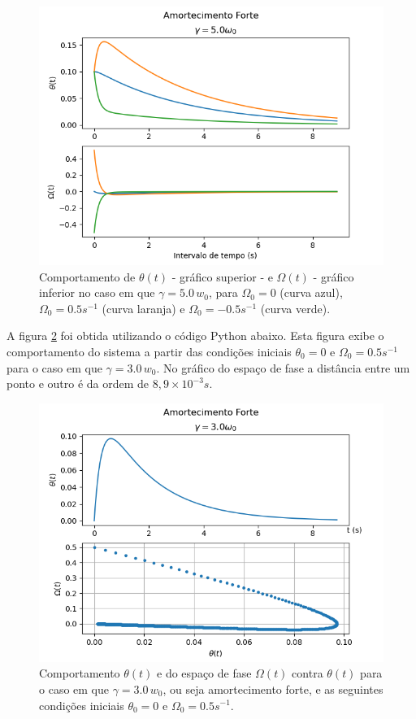 \documentclass[12pt,openright,twoside,english,brazil]{abntex2}
\begin{document}
\begin{figure}[h]
 \centering
 \includegraphics[width=1.0\linewidth]{forte-2.png}
 \caption{Comportamento de $\theta(t)$ - gráfico superior - e $\Omega(t)$ - gráfico inferior no caso em que $\gamma = 5.0\,  w_0$, para $\Omega_0=0$ (curva azul), $\Omega_0=0.5 s^{-1}$ (curva laranja) e $\Omega_0=-0.5 s^{-1}$ (curva verde).}
 \label{Figura11}
\end{figure}

A figura \ref{Figura12} foi obtida utilizando o código Python abaixo. Esta figura exibe o comportamento do sistema a partir das condições iniciais $\theta_0=0$ e $\Omega_0=0.5s^{-1}$ para o caso em que $\gamma=3.0\, w_0$. No gráfico do espaço de fase a distância entre um ponto e outro é da ordem de $8,9\times 10^{-3}s$.



\begin{figure}[t]
 \centering
 \includegraphics[width=1.0\linewidth]{forte-fase-1.png}
 \caption{Comportamento $\theta(t)$ e do espaço de fase $\Omega(t)$ contra $\theta(t)$ para o caso em que $\gamma=3.0\, w_0$, ou seja amortecimento forte, e as seguintes condições iniciais $\theta_0=0$ e $\Omega_0=0.5s^{-1}$.}
 \label{Figura12}
\end{figure}
\end{document}
